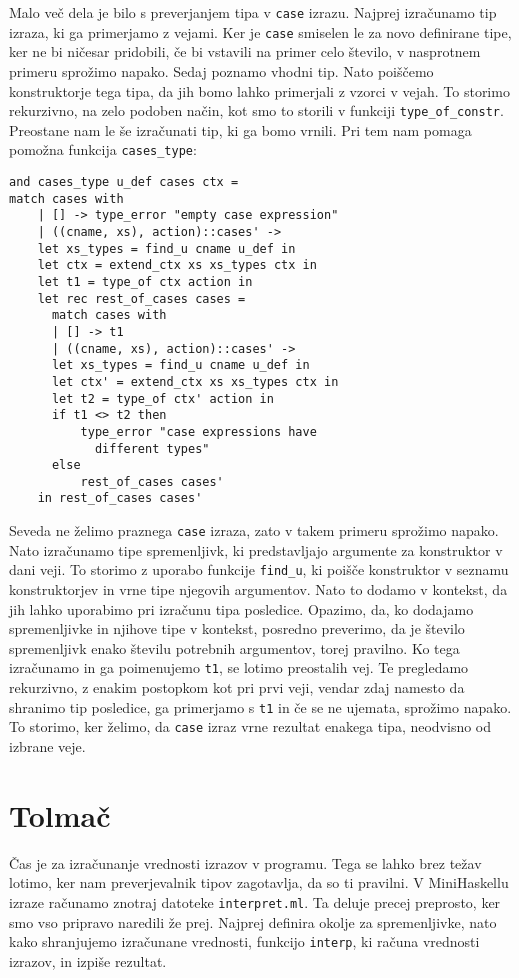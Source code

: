 \documentclass[12pt,a4paper,openany]{book}
\begin{document}
Malo več dela je bilo s preverjanjem tipa v \lstinline{case} izrazu. Najprej izračunamo tip izraza, ki ga primerjamo z vejami. Ker je \lstinline{case} smiselen le za novo definirane tipe, ker ne bi ničesar 
pridobili, če bi vstavili na primer celo število, v nasprotnem primeru sprožimo napako. Sedaj poznamo vhodni tip. Nato poiščemo konstruktorje tega tipa, da jih bomo lahko primerjali z vzorci v vejah.
To storimo rekurzivno, na zelo podoben način, kot smo to storili v funkciji \lstinline{type_of_constr}. Preostane nam le še izračunati tip, ki ga bomo vrnili. Pri tem nam pomaga pomožna funkcija 
\lstinline{cases_type}:
\begin{lstlisting}
and cases_type u_def cases ctx =
match cases with
    | [] -> type_error "empty case expression"
    | ((cname, xs), action)::cases' ->
    let xs_types = find_u cname u_def in
    let ctx = extend_ctx xs xs_types ctx in
    let t1 = type_of ctx action in
    let rec rest_of_cases cases =
      match cases with
      | [] -> t1
      | ((cname, xs), action)::cases' ->
      let xs_types = find_u cname u_def in
      let ctx' = extend_ctx xs xs_types ctx in
      let t2 = type_of ctx' action in
      if t1 <> t2 then
          type_error "case expressions have 
            different types"
      else
          rest_of_cases cases'
    in rest_of_cases cases'
\end{lstlisting}
Seveda ne želimo praznega \lstinline{case} izraza, zato v takem primeru sprožimo napako. Nato izračunamo tipe spremenljivk, ki predstavljajo argumente za konstruktor v dani veji. To storimo z uporabo
funkcije \lstinline{find_u}, ki poišče konstruktor v seznamu konstruktorjev in vrne tipe njegovih argumentov. Nato to dodamo v kontekst, da jih lahko uporabimo pri izračunu tipa posledice. Opazimo, 
da, ko dodajamo spremenljivke in njihove tipe v kontekst, posredno preverimo, da je število spremenljivk enako številu potrebnih argumentov, torej pravilno. Ko tega izračunamo in ga 
poimenujemo \lstinline{t1}, se lotimo preostalih vej. Te pregledamo rekurzivno, z enakim postopkom kot pri prvi veji, vendar zdaj namesto da shranimo tip posledice, ga primerjamo s \lstinline{t1} in če 
se ne ujemata, sprožimo napako. To storimo, ker želimo, da \lstinline{case} izraz vrne rezultat enakega tipa, neodvisno od izbrane veje.

\section{Tolmač}
Čas je za izračunanje vrednosti izrazov v programu. Tega se lahko brez težav lotimo, ker nam preverjevalnik tipov zagotavlja, da so ti pravilni. V MiniHaskellu izraze računamo znotraj datoteke 
\lstinline{interpret.ml}. Ta deluje precej preprosto, ker smo vso pripravo naredili že prej. Najprej definira okolje za spremenljivke, nato kako shranjujemo izračunane vrednosti, funkcijo 
\lstinline{interp}, ki računa vrednosti izrazov, in izpiše rezultat. 
\end{document}
